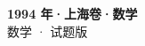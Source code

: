 \documentclass[zihao=-4, a4paper]{ctexart}
\begin{document}
\begin{center}
  {\Large\bfseries 1994 年·上海卷·数学}\\[4pt]
  {\large 数学 · 试题版}
\end{center}
\medskip
{}

\end{document}
